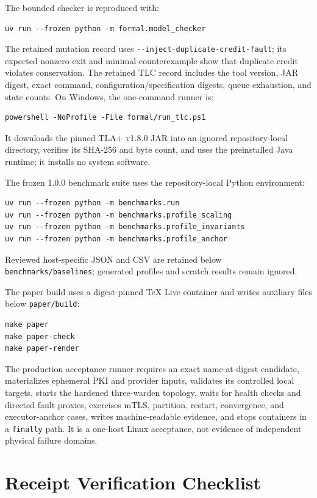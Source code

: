 \documentclass[10pt]{article}
\newcommand{\code}[1]{\nolinkurl{#1}}
\begin{document}
The bounded checker is reproduced with:
\begin{verbatim}
uv run --frozen python -m formal.model_checker
\end{verbatim}
The retained mutation record uses \code{--inject-duplicate-credit-fault}; its expected nonzero exit
and minimal counterexample show that duplicate credit violates conservation. The retained TLC
record includes the tool version, JAR digest, exact command, configuration/specification digests,
queue exhaustion, and state counts. On Windows, the one-command runner is:
\begin{verbatim}
powershell -NoProfile -File formal/run_tlc.ps1
\end{verbatim}
It downloads the pinned TLA+ v1.8.0 JAR into an ignored repository-local directory, verifies its
SHA-256 and byte count, and uses the preinstalled Java runtime; it installs no system software.

The frozen 1.0.0 benchmark suite uses the repository-local Python environment:
\begin{verbatim}
uv run --frozen python -m benchmarks.run
uv run --frozen python -m benchmarks.profile_scaling
uv run --frozen python -m benchmarks.profile_invariants
uv run --frozen python -m benchmarks.profile_anchor
\end{verbatim}
Reviewed host-specific JSON and CSV are retained below \code{benchmarks/baselines}; generated
profiles and scratch results remain ignored.

The paper build uses a digest-pinned TeX Live container and writes auxiliary files below
\code{paper/build}:
\begin{verbatim}
make paper
make paper-check
make paper-render
\end{verbatim}

The production acceptance runner requires an exact name-at-digest candidate, materializes
ephemeral PKI and provider inputs, validates its controlled local targets, starts the hardened
three-warden topology, waits for health checks and directed fault proxies, exercises mTLS,
partition, restart, convergence, and executor-anchor cases, writes machine-readable evidence, and
stops containers in a \code{finally} path. It is a one-host Linux acceptance, not evidence of
independent physical failure domains.

\section{Receipt Verification Checklist}
\end{document}
